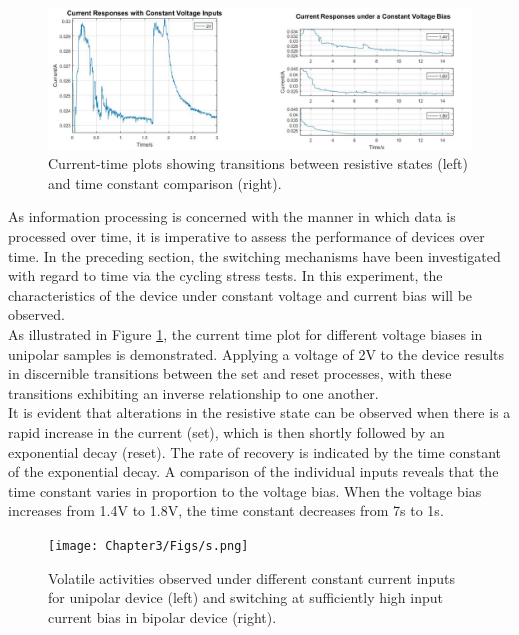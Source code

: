 \begin{figure}[htbp!] 
    \centering    
    \includegraphics[width=1\textwidth]{Chapter3/Figs/r.png}
    \caption[Current-time plots showing transitions between resistive states.]{Current-time plots showing transitions between resistive states (left) and time constant comparison (right).}
    \label{fig:3r}
\end{figure}

\noindent As information processing is concerned with the manner in which data is processed over time, it is imperative to assess the performance of devices over time. In the preceding section, the switching mechanisms have been investigated with regard to time via the cycling stress tests. In this experiment, the characteristics of the device under constant voltage and current bias will be observed.\\

\noindent As illustrated in Figure \ref{fig:3r}, the current time plot for different voltage biases in unipolar samples is demonstrated. Applying a voltage of 2V to the device results in discernible transitions between the set and reset processes, with these transitions exhibiting an inverse relationship to one another. \\

\noindent It is evident that alterations in the resistive state can be observed when there is a rapid increase in the current (set), which is then shortly followed by an exponential decay (reset). The rate of recovery is indicated by the time constant of the exponential decay. A comparison of the individual inputs reveals that the time constant varies in proportion to the voltage bias. When the voltage bias increases from 1.4V to 1.8V, the time constant decreases from 7s to 1s.\\

\begin{figure}[htbp!] 
    \centering    
    \texttt{[image: Chapter3/Figs/s.png]}
    \caption[Volatile activities observed under different constant current inputs.]{Volatile activities observed under different constant current inputs for unipolar device (left) and switching at sufficiently high input current bias in bipolar device (right).}
    \label{fig:3s}
\end{figure}

